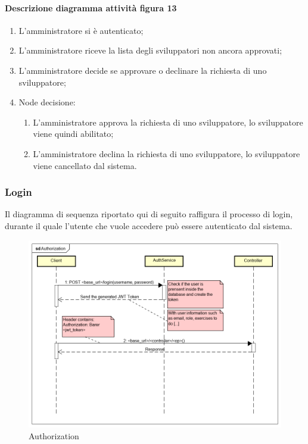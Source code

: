 \paragraph{Descrizione diagramma attività figura 13}
\begin{enumerate}
\item L'amministratore si è autenticato;
\item L'amministratore riceve la lista degli sviluppatori non ancora approvati; 
\item L'amministratore decide se approvare o declinare la richiesta di uno sviluppatore; 
\item Node decisione:
\begin{enumerate}
	\item L'amministratore approva la richiesta di uno sviluppatore, lo sviluppatore viene quindi abilitato;
	\item L'amministratore declina la richiesta di uno sviluppatore, lo sviluppatore viene cancellato dal sistema. 
\end{enumerate}
\end{enumerate}



\subsubsection{Login}
Il diagramma di sequenza riportato qui di seguito raffigura il processo di login, durante il quale l'utente che vuole accedere può essere autenticato dal sistema.
\begin{figure}[H]
\centering
\includegraphics[width=17cm, keepaspectratio]{img/Authorization.png} 
\caption{Authorization}
\end{figure}


